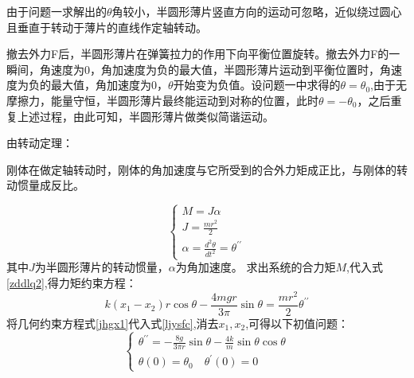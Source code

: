 \documentclass[withoutpreface,bwprint]{cumcmthesis} %
\begin{document}
	由于问题一求解出的$\theta$角较小，半圆形薄片竖直方向的运动可忽略，近似绕过圆心且垂直于转动于薄片的直线作定轴转动。
	
	撤去外力F后，半圆形薄片在弹簧拉力的作用下向平衡位置旋转。撤去外力F的一瞬间，角速度为0，角加速度为负的最大值，半圆形薄片运动到平衡位置时，角速度为负的最大值，角加速度为0，$\theta$开始变为负值。设问题一中求得的$\theta=\theta_0$,由于无摩擦力，能量守恒，半圆形薄片最终能运动到对称的位置，此时$\theta=-\theta_0$，之后重复上述过程，由此可知，半圆形薄片做类似简谐运动。
	
	由转动定理：
	\begin{theorem}
		刚体在做定轴转动时，刚体的角加速度与它所受到的合外力矩成正比，与刚体的转动惯量成反比。
		\label{lem:example}
	\end{theorem}
	 
	\begin{equation}
	\left\{\begin{array}{l}
	M=J \alpha\\
	J=\frac{m r^2}{2}\\
	\alpha = \frac{d^{2} \theta}{d t^{2}} = \theta^{\prime \prime}
	\label{zddlq2}
	\end{array}\right.
	\end{equation}
	其中$J$为半圆形薄片的转动惯量，$\alpha$为角加速度。
	求出系统的合力矩$M$,代入式\ref{zddlq2},得力矩约束方程：
	\begin{equation}
	k\left(x_{1}-x_{2}\right) r \cos \theta-\frac{4 mg r}{3\pi} \sin \theta=\frac{mr^{2}}{2} \theta^{\prime \prime}
	\label{ljysfc}
	\end{equation}
	将几何约束方程式\ref{jhgx1}代入式\ref{ljysfc},消去$x_1,x_2$,可得以下初值问题：
	\begin{equation}\label{czq2}
	\left\{\begin{array}{l}
	\theta^{\prime \prime}=-\frac{8g}{3 \pi r} \sin \theta-\frac{4 k}{m} \sin \theta \cos \theta \\
	\theta(0)=\theta_{0} \quad \theta^{\prime}(0)=0
	\end{array}\right.
	\end{equation}
\end{document}
